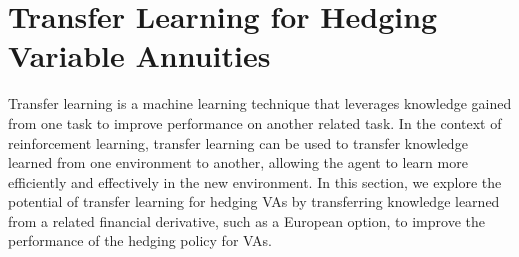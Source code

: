 \section{Transfer Learning for Hedging Variable Annuities}

Transfer learning is a machine learning technique that leverages knowledge gained from one task to improve performance on another related task.
In the context of reinforcement learning, transfer learning can be used to transfer knowledge learned from one environment to another, allowing the agent to learn more efficiently and effectively in the new environment.
In this section, we explore the potential of transfer learning for hedging VAs by transferring knowledge learned from a related financial derivative, such as a European option, to improve the performance of the hedging policy for VAs.

